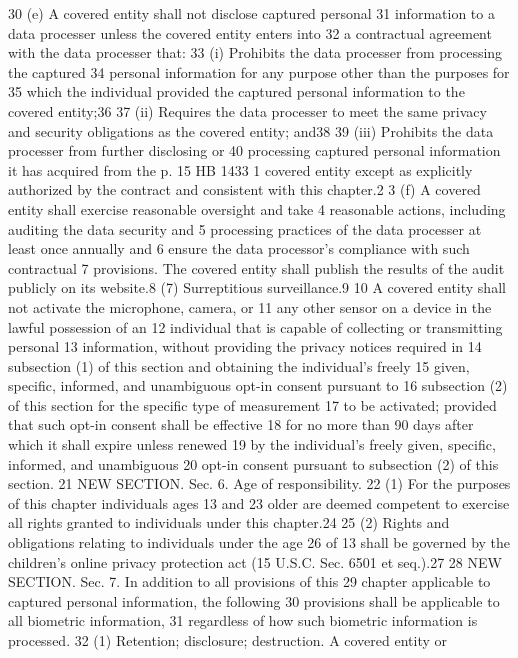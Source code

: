 30 (e) A covered entity shall not disclose captured personal
31 information to a data processer unless the covered entity enters into
32 a contractual agreement with the data processer that:
33 (i) Prohibits the data processer from processing the captured
34 personal information for any purpose other than the purposes for
35 which the individual provided the captured personal information to
the covered entity;36
37 (ii) Requires the data processer to meet the same privacy and
security obligations as the covered entity; and38
39 (iii) Prohibits the data processer from further disclosing or
40 processing captured personal information it has acquired from the
p. 15 HB 1433
1 covered entity except as explicitly authorized by the contract and
consistent with this chapter.2
3 (f) A covered entity shall exercise reasonable oversight and take
4 reasonable actions, including auditing the data security and
5 processing practices of the data processer at least once annually and
6 ensure the data processor's compliance with such contractual
7 provisions. The covered entity shall publish the results of the audit
publicly on its website.8
(7) Surreptitious surveillance.9
10 A covered entity shall not activate the microphone, camera, or
11 any other sensor on a device in the lawful possession of an
12 individual that is capable of collecting or transmitting personal
13 information, without providing the privacy notices required in
14 subsection (1) of this section and obtaining the individual's freely
15 given, specific, informed, and unambiguous opt-in consent pursuant to
16 subsection (2) of this section for the specific type of measurement
17 to be activated; provided that such opt-in consent shall be effective
18 for no more than 90 days after which it shall expire unless renewed
19 by the individual's freely given, specific, informed, and unambiguous
20 opt-in consent pursuant to subsection (2) of this section.
21 NEW SECTION. Sec. 6. Age of responsibility.
22 (1) For the purposes of this chapter individuals ages 13 and
23 older are deemed competent to exercise all rights granted to
individuals under this chapter.24
25 (2) Rights and obligations relating to individuals under the age
26 of 13 shall be governed by the children's online privacy protection
act (15 U.S.C. Sec. 6501 et seq.).27
28 NEW SECTION. Sec. 7. In addition to all provisions of this
29 chapter applicable to captured personal information, the following
30 provisions shall be applicable to all biometric information,
31 regardless of how such biometric information is processed.
32 (1) Retention; disclosure; destruction. A covered entity or
